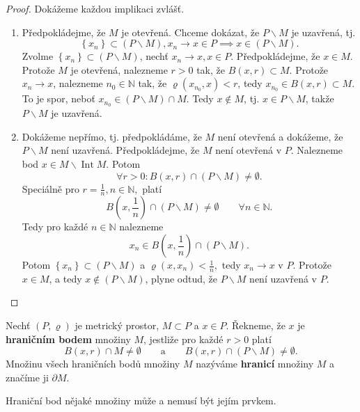 \begin{proof}
	Dokážeme každou implikaci zvlášť.
	\begin{enumerate}
		\item[$\implies$] Předpokládejme, že $M$ je otevřená. Chceme dokázat, že $P \smallsetminus M$ je
		uzavřená, tj.
		$$
  \left \{ x_n \right \} \subset (P \smallsetminus M), x_n \to x \in P \implies x \in (P \smallsetminus M).
		$$
		Zvolme $\left \{ x_n \right \} \subset (P \smallsetminus M)$, nechť $x_n \to x, x \in P$.
		Předpokládejme, že $x \in M$. Protože $M$ je otevřená, nalezneme $r >0$ tak, že
		$B(x,r)\subset M$. Protože $x_n \to x$, nalezneme $n_0\in \mathbb N $ tak, že $\varrho(x_{n_0},x)<r$,
		tedy $x_{n_0}\in B(x,r) \subset M$. To je spor, neboť $x_{n_0}\in (P \smallsetminus M)\cap M$.
		Tedy $x \notin M$, tj. $x \in P \smallsetminus M$, takže $P \smallsetminus M$ je uzavřená.
		\item[$\impliedby$] Dokážeme nepřímo, tj. předpokládáme, že $M$ není otevřená a dokážeme,
		že $P \smallsetminus M$ není uzavřená. Předpokládejme, že $M$ není otevřená v $P$. Nalezneme
		bod $x \in M \smallsetminus\operatorname{Int} M$. Potom
		$$\forall r >0:B(x,r)\cap (P \smallsetminus M) \ne \emptyset.$$
		Speciálně pro $r=\frac{1}{n}, n \in \mathbb N ,$ platí
		$$
		    B \left( x, \frac{1}{n} \right ) \cap (P \smallsetminus M) \ne \emptyset \qquad \forall n \in \mathbb N .
		$$
		Tedy pro každé $n \in \mathbb N $ nalezneme
		$$
		    x_n \in B \left( x, \frac{1}{n} \right ) \cap (P \smallsetminus M).
		$$
		Potom $\left \{ x_n \right \} \subset (P \smallsetminus M)$ a $\varrho (x,x_n)<\frac{1}{n},$ tedy
		$x_n\to x$ v $P$. Protože $x \in M$, a tedy $x \notin (P \smallsetminus M)$, plyne odtud,
		že $P \smallsetminus M$ není uzavřená v $P$. \qedhere
	\end{enumerate}
\end{proof}

\begin{definice}
Nechť $(P,\varrho)$ je metrický prostor, $M\subset P$ a $x\in P$. Řekneme, že $x$ je \textbf{hraničním bodem} množiny $M$, jestliže pro každé $r>0$ platí
\[
B(x,r)\cap M\neq\emptyset \qquad \text{a} \qquad B(x,r)\cap(P\smallsetminus M)\neq\emptyset.
\]
Množinu všech hraničních bodů množiny $M$ nazýváme \textbf{hranicí} množiny $M$ a značíme ji $\partial M$.
\end{definice}

\begin{poznamka}
	Hraniční bod nějaké množiny může a nemusí být jejím prvkem.
\end{poznamka}

